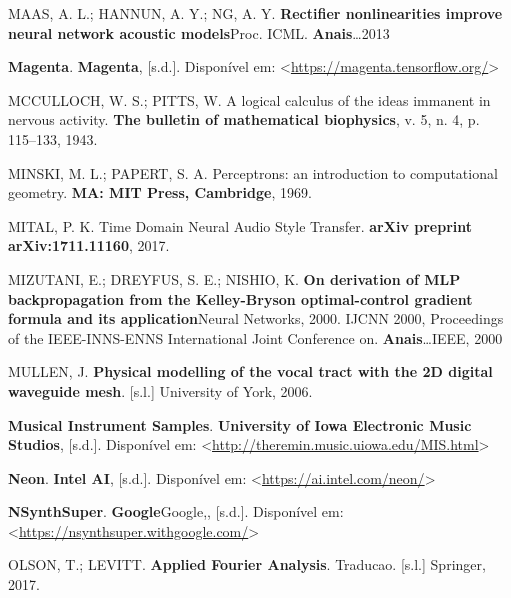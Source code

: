 \documentclass[]{article}
\begin{document}
\leavevmode\hypertarget{ref-maas2013rectifier}{}%
MAAS, A. L.; HANNUN, A. Y.; NG, A. Y. \textbf{Rectifier nonlinearities
improve neural network acoustic models}Proc. ICML.
\textbf{Anais}\ldots{}2013

\leavevmode\hypertarget{ref-magenta}{}%
\textbf{Magenta}. \textbf{Magenta}, {[}s.d.{]}. Disponível em:
\textless{}\url{https://magenta.tensorflow.org/}\textgreater{}

\leavevmode\hypertarget{ref-mcculloch1943logical}{}%
MCCULLOCH, W. S.; PITTS, W. A logical calculus of the ideas immanent in
nervous activity. \textbf{The bulletin of mathematical biophysics}, v.
5, n. 4, p. 115--133, 1943.

\leavevmode\hypertarget{ref-minski1969perceptrons}{}%
MINSKI, M. L.; PAPERT, S. A. Perceptrons: an introduction to
computational geometry. \textbf{MA: MIT Press, Cambridge}, 1969.

\leavevmode\hypertarget{ref-mital2017time}{}%
MITAL, P. K. Time Domain Neural Audio Style Transfer. \textbf{arXiv
preprint arXiv:1711.11160}, 2017.

\leavevmode\hypertarget{ref-mizutani2000derivation}{}%
MIZUTANI, E.; DREYFUS, S. E.; NISHIO, K. \textbf{On derivation of MLP
backpropagation from the Kelley-Bryson optimal-control gradient formula
and its application}Neural Networks, 2000. IJCNN 2000, Proceedings of
the IEEE-INNS-ENNS International Joint Conference on.
\textbf{Anais}\ldots{}IEEE, 2000

\leavevmode\hypertarget{ref-mullen2006physical}{}%
MULLEN, J. \textbf{Physical modelling of the vocal tract with the 2D
digital waveguide mesh}. {[}s.l.{]} University of York, 2006.

\leavevmode\hypertarget{ref-iowa}{}%
\textbf{Musical Instrument Samples}. \textbf{University of Iowa
Electronic Music Studios}, {[}s.d.{]}. Disponível em:
\textless{}\url{http://theremin.music.uiowa.edu/MIS.html}\textgreater{}

\leavevmode\hypertarget{ref-neon}{}%
\textbf{Neon}. \textbf{Intel AI}, {[}s.d.{]}. Disponível em:
\textless{}\url{https://ai.intel.com/neon/}\textgreater{}

\leavevmode\hypertarget{ref-google}{}%
\textbf{NSynthSuper}. \textbf{Google}Google,, {[}s.d.{]}. Disponível em:
\textless{}\url{https://nsynthsuper.withgoogle.com/}\textgreater{}

\leavevmode\hypertarget{ref-olson2017applied}{}%
OLSON, T.; LEVITT. \textbf{Applied Fourier Analysis}. Traducao.
{[}s.l.{]} Springer, 2017.
\end{document}

